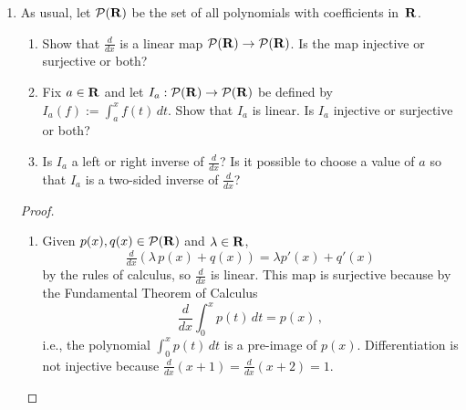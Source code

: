\documentclass[11pt]{amsart}
\begin{document}
\begin{enumerate}[(1)]
\begin{proof}
\begin{enumerate}
\item Let $V = \P(\R)$ and define the maps $S, T \in L(V)$ through
\[
  S(p(x)) = p'(x)
  \qquad \text{ and } \qquad
  T(p(x)) = \int_0^x p(t) \, dt .
\]
Then $ST$ is the identity map with $\null(ST) = \left\{ 0 \right\}$; however, $\null(S)$ consists of all constant polynomials.

\item Suppose $\w \in \range(ST)$, i.e., there exists $\v \in V$ such that $S(T(\v)) = \w$. Then $\w \in \range(S)$ because $T(\v)$ is the pre-image of $\w$ under $S$.

\item Let $V = \P(\R)$, let $T$ be the identity map, and $S(p(x)) = x \, p(x)$.
Then $\range(T) = V$; however, $\range(ST) = \range(S)$ consists of all polynomials that do not have a nonzero constant term. \qedhere

\end{enumerate}
\end{proof}

\item As usual, let $\mathcal{P}(\mathbf{R})$ be the set of all polynomials with coefficients in~$\mathbf{R}$.
  \begin{enumerate}
  \item Show that $\frac{d}{dx}$ is a linear map $\mathcal{P}(\mathbf{R}) \rightarrow \mathcal{P}(\mathbf{R})$. Is the map injective or surjective or both?
  \item Fix $a \in \mathbf{R}$ and let $I_a: \mathcal{P}(\mathbf{R}) \rightarrow \mathcal{P}(\mathbf{R})$ be defined by $I_a(f) := \int_a^x f(t)\,dt$. Show that $I_a$ is linear. Is $I_a$ injective or surjective or both?
  \item Is $I_a$ a left or right inverse of $\frac{d}{dx}$? Is it possible to choose a value of $a$ so that $I_a$ is a two-sided inverse of $\frac{d}{dx}$?
\end{enumerate}

\begin{proof}
\begin{enumerate}

\item Given $p(x), q(x) \in \mathcal{P}(\mathbf{R})$ and $\lambda \in \mathbf{R}$,
\[
  \tfrac{d}{dx} \left( \lambda \, p(x) + q(x) \right) = \lambda p'(x) + q'(x)
\]
by the rules of calculus, so $\frac{d}{dx}$ is linear. This map is surjective because by the Fundamental Theorem of Calculus
\[
  \frac{d}{dx} \int_0^x p(t) \, dt = p(x) \, ,
\]
i.e., the polynomial $\int_0^x p(t) \, dt$ is a pre-image of $p(x)$.
Differentiation is not injective because $\frac{d}{dx} (x+1) = \frac{d}{dx} (x+2) = 1$.


\end{enumerate}
\end{proof}
\end{enumerate}
\end{document}
